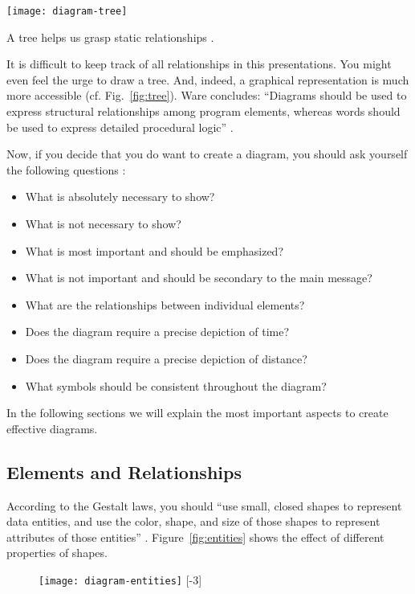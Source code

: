 \begin{marginfigure}
\centering
\texttt{[image: diagram-tree]}
\caption{\label{fig:tree} A tree helps us grasp static relationships \cite{Ware12}.}%
\end{marginfigure}

It is difficult to keep track of all relationships in this presentations. You might even feel the urge to draw a tree. And, indeed, a graphical representation is much more accessible (cf. Fig.~\ref{fig:tree}). Ware concludes: ``Diagrams should be used to express structural relationships among program elements, whereas words should be used to express detailed procedural logic'' \cite{Ware12}.


Now, if you decide that you do want to create a diagram, you should ask yourself the following questions \cite{Carter12}:
\begin{itemize}
\item What is absolutely necessary to show?
\item What is not necessary to show?
\item What is most important and should be emphasized?
\item What is not important and should be secondary to the main message?
\item What are the relationships between individual elements?
\item Does the diagram require a precise depiction of time?
\item Does the diagram require a precise depiction of distance?
\item What symbols should be consistent throughout the diagram?
\end{itemize}

In the following sections we will explain the most important aspects to create effective diagrams.

\subsection{Elements and Relationships}

According to the Gestalt laws, you should
``use small, closed shapes to represent data entities, and use the color, shape, and size of those shapes to represent attributes of those entities'' \cite{Ware12}. Figure~\ref{fig:entities} shows the effect of different properties of shapes.

\begin{figure}[t]
\centering
\texttt{[image: diagram-entities]}
[-3\baselineskip]
\end{figure}


